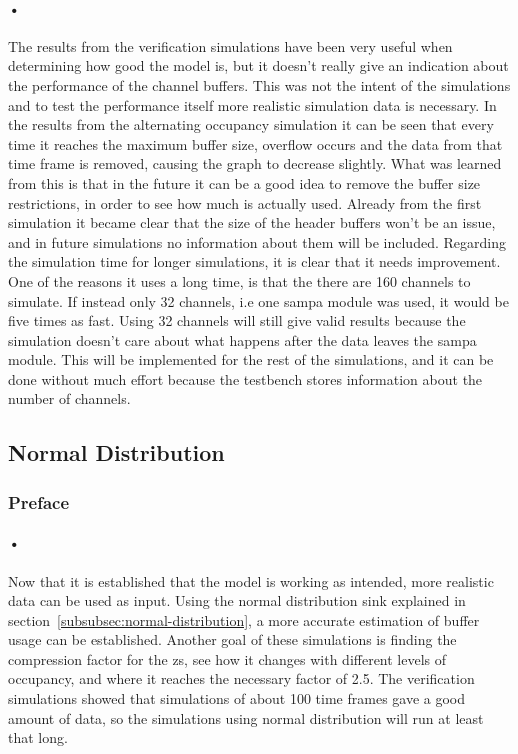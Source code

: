\documentclass[a4paper, 12pt]{report}
\begin{document}
\paragraph{•}
The results from the verification simulations have been very useful when determining how good the model is, but it doesn't really give an indication about the performance of the channel buffers.
This was not the intent of the simulations and to test the performance itself more realistic simulation data is necessary.
In the results from the alternating occupancy simulation it can be seen that every time it reaches the maximum buffer size, overflow occurs and the data from that time frame is removed, causing the graph to decrease slightly.
What was learned from this is that in the future it can be a good idea to remove the buffer size restrictions, in order to see how much is actually used.
Already from the first simulation it became clear that the size of the header buffers won't be an issue, and in future simulations no information about them will be included. 
Regarding the simulation time for longer simulations, it is clear that it needs improvement.
One of the reasons it uses a long time, is that the there are 160 channels to simulate.
If instead only 32 channels, i.e one \gls{sampa} module was used, it would be five times as fast.
Using 32 channels will still give valid results because the simulation doesn't care about what happens after the data leaves the \gls{sampa} module.
This will be implemented for the rest of the simulations, and it can be done without much effort because the testbench stores information about the number of channels.

\subsection{Normal Distribution}

\subsubsection{Preface}

\paragraph{•}
Now that it is established that the model is working as intended, more realistic data can be used as input.
Using the normal distribution sink explained in section~\ref{subsubsec:normal-distribution}, a more accurate estimation of buffer usage can be established.
Another goal of these simulations is finding the compression factor for the \gls{zs}, see how it changes with different levels of occupancy, and where it reaches the necessary factor of 2.5.
The verification simulations showed that simulations of about 100 time frames gave a good amount of data, so the simulations using normal distribution will run at least that long.
\end{document}
